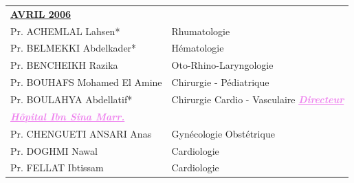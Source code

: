     \begin{table}[H]

      \begin{tabular}{l l}
       \multicolumn{2}{l}{\textbf{\underline{AVRIL 2006}}}\vspace*{0.5em}\\
       Pr. ACHEMLAL Lahsen* & \hspace*{2em} Rhumatologie\\
       Pr. BELMEKKI Abdelkader* & \hspace*{2em} Hématologie \\
       Pr. BENCHEIKH Razika & \hspace*{2em} Oto-Rhino-Laryngologie \\
       Pr. BOUHAFS Mohamed El Amine	& \hspace*{2em} Chirurgie - Pédiatrique \\
       Pr. BOULAHYA Abdellatif* & \hspace*{2em} Chirurgie Cardio - Vasculaire \textcolor{violet}{\textbf{\emph{\underline{Directeur }}}}  \\
       \textcolor{violet}{\textbf{\emph{\underline{Hôpital Ibn Sina Marr.}}}} & \\
       Pr. CHENGUETI ANSARI Anas &  \hspace*{2em} Gynécologie Obstétrique\\
       Pr. DOGHMI Nawal &  \hspace*{2em} Cardiologie\\
       Pr. FELLAT Ibtissam	& \hspace*{2em} Cardiologie\\
      


  
      \end{tabular}
      
      \end{table}
    
